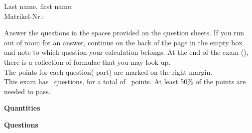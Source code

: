 




\vspace{0.3in}
\begin{flushright}
  Last name, first name:\enspace\underline{\hspace{7cm}}\\[1em]
  Matrikel-Nr.:         \enspace\underline{\hspace{7cm}}
\end{flushright}
\vspace{0.3em}
\begin{center}
  \begin{infobox}[frametitle={Important Notes:}]
    Answer the questions in the spaces provided on the
    question sheets.  If you run out of room for an answer,
    continue on the back of the page in the empty box and
    note to which question your calculation belongs. At the end of the exam
    (), there is a collection of formulae that you may
    look up.\\

    The points for each question(-part) are marked on the right margin.\\

    This exam has \numquestions\ questions, for a total of \numpoints\
    points. At least 50\% of the points are needed to pass.

  \end{infobox}
\end{center}
\vspace{0.3em}


\begin{center}
  \begin{Large}
    \bf Quantities\\[-1em]
    \label{sec:quantities}
  \end{Large}
\end{center}


\examnewpage


\begin{center}
  \begin{Large}
    \bf Questions\\[1em]
    \label{sec:small}
  \end{Large}
\end{center}



